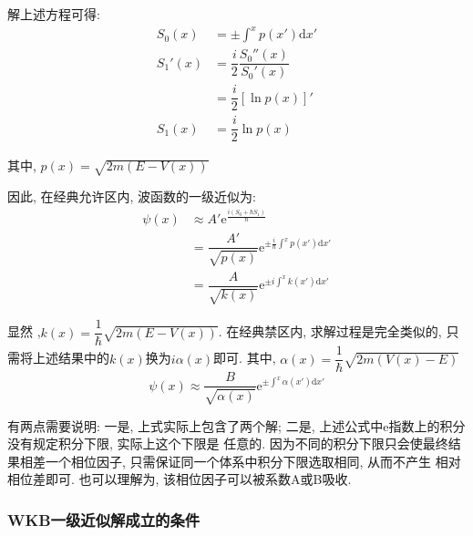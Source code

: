 \documentclass[a4paper, 11pt]{article}
\begin{document}
\begin{spacing}{1.2}
          解上述方程可得:
          \begin{equation}
            \begin{aligned}
              S_0(x) &= \pm\int^xp(x')\mathrm{d}x'\\
              S_1'(x) &= \dfrac{i}{2}\dfrac{S_0''(x)}{S_0'(x)} \\   
                      &= \dfrac{i}{2}[\ln{}p(x)]'\\
              S_1(x) &=  \dfrac{i}{2}\ln{}p(x)   
            \end{aligned}
          \end{equation}

          其中,  $p(x)=\sqrt{2m(E-V(x))}$

          因此, 在经典允许区内, 波函数的一级近似为:
          \begin{equation}
            \begin{aligned}
            \psi(x) &\approx A'\mathrm{e}^{\frac{i(S_0+\hbar{}S_1)}{\hbar}} \\
                    &=\dfrac{A'}{\sqrt{p(x)}}\mathrm{e}^{\pm\frac{i}{\hbar}\int^xp(x')\mathrm{d}x'}\\
                    &=\dfrac{A}{\sqrt{k(x)}}\mathrm{e}^{\pm{}i\int^xk(x')\mathrm{d}x'}
            \end{aligned}  
          \end{equation}
          
          显然 ,$k(x) = \dfrac{1}{\hbar}\sqrt{2m(E-V(x))}$.
          在经典禁区内, 求解过程是完全类似的, 只需将上述结果中的$k(x)$换为$i\alpha(x)$即可. 其中, 
          $\alpha(x) = \dfrac{1}{\hbar}\sqrt{2m(V(x)-E)}$
          \begin{equation}
            \psi(x) \approx%
            \dfrac{B}{\sqrt{\alpha(x)}}\mathrm{e}^{\pm\int^x\alpha(x')\mathrm{d}x'}
          \end{equation}

          有两点需要说明: 一是, 上式实际上包含了两个解; 二是, 上述公式中e指数上的积分没有规定积分下限, 实际上这个下限是
          任意的. 因为不同的积分下限只会使最终结果相差一个相位因子, 只需保证同一个体系中积分下限选取相同, 从而不产生
          相对相位差即可. 也可以理解为, 该相位因子可以被系数A或B吸收. 

        \subsubsection{WKB一级近似解成立的条件}


\end{spacing}
\end{document}

